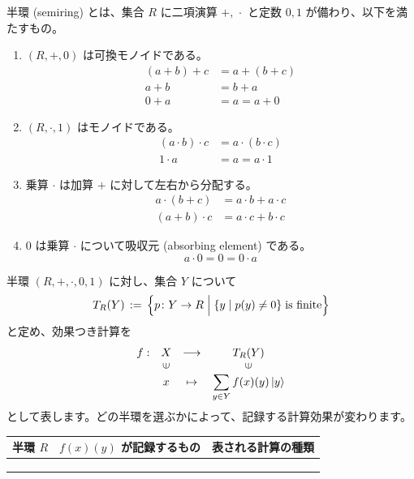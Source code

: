 \documentclass[
		head_space=20mm,
		foot_space=20mm,
		gutter=10mm,
		line_length=190mm
]{jlreq}
\begin{document}
\begin{definition}[半環]
	半環 (semiring) とは、集合 $R$ に二項演算 $+,\,{\cdot}$ と定数 $0,1$ が備わり、以下を満たすもの。
	\begin{enumerate}
		\item $(R,+,0)$ は可換モノイドである。
		\begin{align*}
			(a+b)+c &= a+(b+c)\\
			a+b&=b+a\\
			0+a & =a=a+0
		\end{align*}
		\item $(R,{\cdot},1)$ はモノイドである。
		\begin{align*}
			(a\cdot b)\cdot c &= a\cdot (b\cdot c)\\
			1\cdot a & =a=a\cdot 1
		\end{align*}
		\item 乗算 $\cdot$ は加算 $+$ に対して左右から分配する。
		\begin{align*}
			a\cdot (b+c) &= a\cdot b+a\cdot c\\
			(a+b)\cdot c &= a\cdot c+b\cdot c
		\end{align*}
		\item $0$ は乗算 $\cdot$ について吸収元 (absorbing element) である。
		\[a\cdot 0=0=0\cdot a\]
	\end{enumerate}
\end{definition}

\noindent 半環 $(R,+,\cdot,0,1)$ に対し、集合 $Y$ について
\[T_R(Y)\,:=\,\Bigl\{p\colon Y\to R \Bigm| \{y\mid p(y)\neq 0\}\;\textrm{is finite}\Bigr\}\]
と定め、効果つき計算を \[\begin{array}{cccc}f:&X&\longrightarrow&T_R(Y)\\&\rotatebox{90}{$\in$}&&\rotatebox{90}{$\in$}\\&x&\mapsto&\displaystyle\sum_{y\in Y}f(x)(y)\Ket{y}\end{array}\]
として表します。どの半環を選ぶかによって、記録する計算効果が変わります。\vspace{8pt}

\begin{center}
	\begin{tabular}{c|c|c}
		\hline
		半環 $R$ & $f(x)(y)$ が記録するもの & 表される計算の種類 \\
		\hline 
		& & \\\hline 
		& & \\\hline 
		& & \\\hline 
	\end{tabular}
\end{center}
\end{document}
